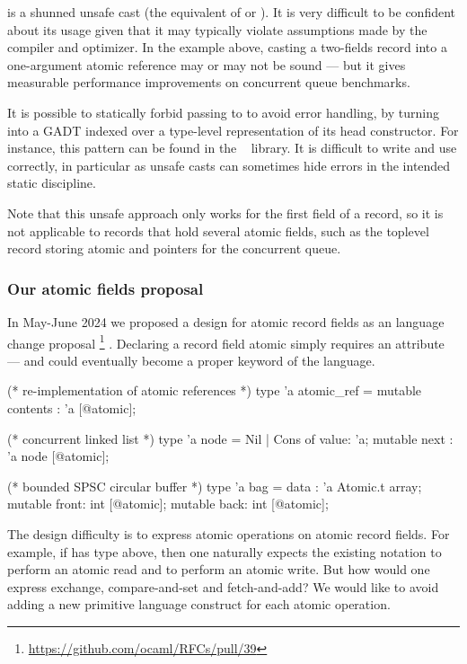  is a shunned unsafe cast (the \OCaml equivalent of  or ).
It is very difficult to be confident about its usage given that it may typically violate assumptions made by the \OCaml compiler and optimizer.
In the example above, casting a two-fields record into a one-argument atomic reference may or may not be sound --- but it gives measurable performance improvements on concurrent queue benchmarks.

It is possible to statically forbid passing  to  to avoid error handling, by turning  into a GADT indexed over a type-level representation of its head constructor.
For instance, this pattern can be found in the \Kcas~\citep{kcas} library.
It is difficult to write and use correctly, in particular as unsafe casts can sometimes hide errors in the intended static discipline.

Note that this unsafe approach only works for the first field of a record, so it is not applicable to records that hold several atomic fields, such as the toplevel record storing atomic  and  pointers for the concurrent queue.

\subsubsection{Our atomic fields proposal}

In May-June 2024 we proposed a design for atomic record fields as an \OCaml language change proposal%
\footnote{
\url{https://github.com/ocaml/RFCs/pull/39}
}%
.
Declaring a record field atomic simply requires an \ocamlinline{[@atomic]} attribute --- and could eventually become a proper keyword of the language.
\begin{ocamlcode}
(* re-implementation of atomic references *)
type 'a atomic_ref = { mutable contents : 'a [@atomic]; }

(* concurrent linked list *)
type 'a node = Nil | Cons of { value: 'a; mutable next : 'a node [@atomic]; }

(* bounded SPSC circular buffer *)
type 'a bag = { data : 'a Atomic.t array;
                mutable front: int [@atomic];
                mutable back: int [@atomic]; }
\end{ocamlcode}

The design difficulty is to express atomic operations on atomic record fields.
For example, if  has type  above, then one naturally expects the existing notation  to perform an atomic read and  to perform an atomic write.
But how would one express exchange, compare-and-set and fetch-and-add?
We would like to avoid adding a new primitive language construct for each atomic operation.

